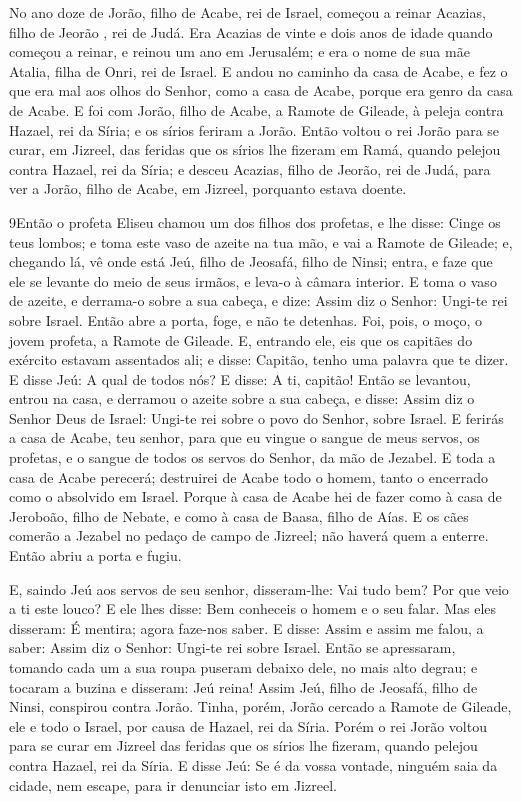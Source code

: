 No ano doze de Jorão, filho de Acabe, rei de Israel, começou a
reinar Acazias, filho de Jeorão , rei de Judá. Era Acazias de
vinte e dois anos de idade quando começou a reinar, e reinou um ano
em Jerusalém; e era o nome de sua mãe Atalia, filha de Onri, rei de
Israel. E andou no caminho da casa de Acabe, e fez o que era
mal aos olhos do Senhor, como a casa de Acabe, porque era genro da
casa de Acabe. E foi com Jorão, filho de Acabe, a Ramote de
Gileade, à peleja contra Hazael, rei da Síria; e os sírios feriram a
Jorão. Então voltou o rei Jorão para se curar, em Jizreel,
das feridas que os sírios lhe fizeram em Ramá, quando pelejou contra
Hazael, rei da Síria; e desceu Acazias, filho de Jeorão, rei de
Judá, para ver a Jorão, filho de Acabe, em Jizreel, porquanto estava
doente.

\medskip

\lettrine{9} Então o profeta Eliseu chamou um dos filhos dos
profetas, e lhe disse: Cinge os teus lombos; e toma este vaso de
azeite na tua mão, e vai a Ramote de Gileade; e, chegando lá, vê
onde está Jeú, filho de Jeosafá, filho de Ninsi; entra, e faze que
ele se levante do meio de seus irmãos, e leva-o à câmara interior.
E toma o vaso de azeite, e derrama-o sobre a sua cabeça, e dize:
Assim diz o Senhor: Ungi-te rei sobre Israel. Então abre a porta,
foge, e não te detenhas. Foi, pois, o moço, o jovem profeta, a
Ramote de Gileade. E, entrando ele, eis que os capitães do
exército estavam assentados ali; e disse: Capitão, tenho uma palavra
que te dizer. E disse Jeú: A qual de todos nós? E disse: A ti,
capitão! Então se levantou, entrou na casa, e derramou o azeite
sobre a sua cabeça, e disse: Assim diz o Senhor Deus de Israel:
Ungi-te rei sobre o povo do Senhor, sobre Israel. E ferirás a
casa de Acabe, teu senhor, para que eu vingue o sangue de meus
servos, os profetas, e o sangue de todos os servos do Senhor, da mão
de Jezabel. E toda a casa de Acabe perecerá; destruirei de Acabe
todo o homem, tanto o encerrado como o absolvido em Israel.
Porque à casa de Acabe hei de fazer como à casa de Jeroboão,
filho de Nebate, e como à casa de Baasa, filho de Aías. E os
cães comerão a Jezabel no pedaço de campo de Jizreel; não haverá
quem a enterre. Então abriu a porta e fugiu.

E, saindo Jeú aos servos de seu senhor, disseram-lhe: Vai tudo
bem? Por que veio a ti este louco? E ele lhes disse: Bem conheceis o
homem e o seu falar. Mas eles disseram: É mentira; agora
faze-nos saber. E disse: Assim e assim me falou, a saber: Assim diz
o Senhor: Ungi-te rei sobre Israel. Então se apressaram,
tomando cada um a sua roupa puseram debaixo dele, no mais alto
degrau; e tocaram a buzina e disseram: Jeú reina! Assim Jeú,
filho de Jeosafá, filho de Ninsi, conspirou contra Jorão. Tinha,
porém, Jorão cercado a Ramote de Gileade, ele e todo o Israel, por
causa de Hazael, rei da Síria. Porém o rei Jorão voltou para
se curar em Jizreel das feridas que os sírios lhe fizeram, quando
pelejou contra Hazael, rei da Síria. E disse Jeú: Se é da vossa
vontade, ninguém saia da cidade, nem escape, para ir denunciar isto
em Jizreel.


